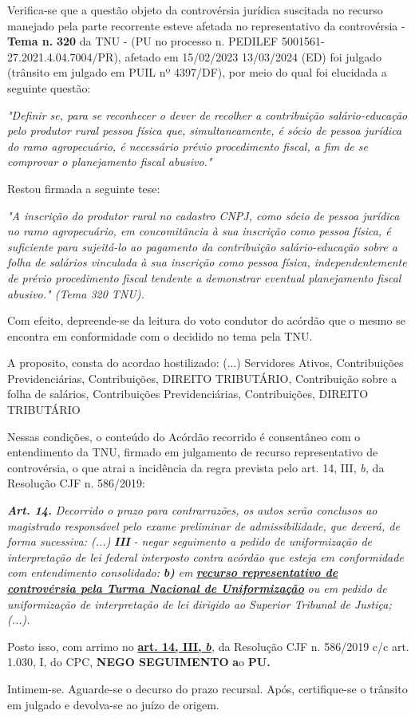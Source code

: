 \documentclass[12pt]{article}
\begin{document}
\justifying
\noindent Verifica-se que a questão objeto da controvérsia jurídica suscitada no recurso manejado pela parte recorrente esteve afetada no representativo da controvérsia - \textbf{Tema n. }\textbf{320} da TNU - (PU no processo n. PEDILEF 5001561-27.2021.4.04.7004/PR),  afetado em 15/02/2023 13/03/2024 (ED) foi julgado (trânsito em julgado em PUIL nº 4397/DF), por meio do qual foi elucidada a seguinte questão:

\noindent \textit{"Definir se, para se reconhecer o dever de recolher a contribuição salário-educação pelo produtor rural pessoa física que, simultaneamente, é sócio de pessoa jurídica do ramo agropecuário, é necessário prévio procedimento fiscal, a fim de se comprovar o planejamento fiscal abusivo."}

\noindent Restou firmada a seguinte tese:

\noindent \textit{"A inscrição do produtor rural no cadastro CNPJ, como sócio de pessoa jurídica no ramo agropecuário, em concomitância à sua inscrição como pessoa física, é suficiente para sujeitá-lo ao pagamento da contribuição salário-educação sobre a folha de salários vinculada à sua inscrição como pessoa física, independentemente de prévio procedimento fiscal tendente a demonstrar eventual planejamento fiscal abusivo." (Tema 320 TNU).}

\noindent Com efeito, depreende-se da leitura do voto condutor do acórdão que o mesmo se encontra em conformidade com o decidido no  tema pela TNU.

\noindent A proposito, consta do acordao hostilizado: (...) Servidores Ativos, Contribuições Previdenciárias, Contribuições, DIREITO TRIBUTÁRIO, Contribuição sobre a folha de salários, Contribuições Previdenciárias, Contribuições, DIREITO TRIBUTÁRIO

\noindent Nessas condições, o conteúdo do Acórdão recorrido é consentâneo com o entendimento da TNU, firmado em julgamento de recurso representativo de controvérsia, o que atrai a incidência da regra prevista pelo art. 14, III, \textit{b,} da Resolução CJF n. 586/2019:

\noindent \textit{\textbf{Art. 14.}}\textit{ Decorrido o prazo para contrarrazões, os autos serão conclusos ao magistrado responsável pelo exame preliminar de admissibilidade, que deverá, de forma sucessiva: (...) }\textit{\textbf{III }}\textit{- negar seguimento a pedido de uniformização de interpretação de lei federal interposto contra acórdão que esteja em conformidade com entendimento consolidado: }\textit{\textbf{b)}}\textit{ em }\uline{\textit{\textbf{recurso representativo de controvérsia pela Turma Nacional de Uniformização}}}\textit{ ou em pedido de uniformização de interpretação de lei dirigido ao Superior Tribunal de Justiça;(...).}

\noindent Posto isso, com arrimo no \uline{\textbf{art. 14, III, }}\uline{\textit{\textbf{b}}}\textit{,} da Resolução CJF n. 586/2019 c/c art. 1.030, I, do CPC, \textbf{NEGO SEGUIMENTO }\textbf{a}o\textbf{ PU}\textbf{.}

\noindent Intimem-se. Aguarde-se o decurso do prazo recursal. Após, certifique-se o trânsito em julgado e devolva-se ao juízo de origem.
\end{document}
